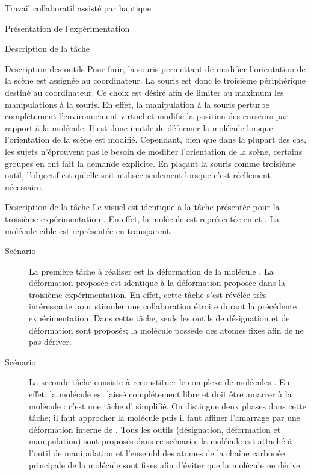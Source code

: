 \documentclass[myfrancais]{mythesis}
\begin{document}
\begin{mychapter}{Travail collaboratif assisté par haptique}
\begin{mysection}{Présentation de l'expérimentation}
\begin{mysubsection}{Description de la tâche}
\begin{mysubsubsection}{Description des outils}
					Pour finir, la souris permettant de modifier l'orientation de la scène est assignée au coordinateur.
					La souris est donc le troisième périphérique destiné au coordinateur.
					Ce choix est désiré afin de limiter au maximum les manipulations à la souris.
					En effet, la manipulation à la souris perturbe complètement l'environnement virtuel et modifie la position des curseurs par rapport à la molécule.
					Il est donc inutile de déformer la molécule lorsque l'orientation de la scène est modifié.
					Cependant, bien que dans la plupart des cas, les sujets n'éprouvent pas le besoin de modifier l'orientation de la scène, certains groupes en ont fait la demande explicite.
					En plaçant la souris comme troisième outil, l'objectif est qu'elle soit utilisée seulement lorsque c'est réellement nécessaire.
				\end{mysubsubsection}
				\begin{mysubsubsection}{Description de la tâche}
					Le visuel est identique à la tâche présentée pour la troisième expérimentation .
					En effet, la molécule est représentée en \myCPK et \myNewRibbon.
					La molécule cible est représentée en \myNewRibbon transparent.
					\begin{description}
						\item[Scénario~]
							La première tâche à réaliser est la déformation de la molécule \myUbiquitin.
							La déformation proposée est identique à la déformation proposée dans la troisième expérimentation.
							En effet, cette tâche s'est révélée très intéressante pour stimuler une collaboration étroite durant la précédente expérimentation.
							Dans cette tâche, seuls les outils de désignation et de déformation sont proposés; la molécule \myUbiquitin possède des atomes fixes afin de ne pas dériver.
						\item[Scénario~]
							La seconde tâche consiste à reconstituer le complexe de molécules \myNusENusG.
							En effet, la molécule \myNusG est laissé complétement libre et doit être amarrer à la molécule \myNusE : c'est une tâche d' simplifié.
							On distingue deux phases dans cette tâche; il faut approcher la molécule \myNusG puis il faut affiner l'amarrage par une déformation interne de \myNusG.
							Tous les outils (désignation, déformation et manipulation) sont proposés dans ce scénario; la molécule \myNusG est attaché à l'outil de manipulation et l'ensembl des atomes de la chaîne carbonée principale de la molécule \myNusE sont fixes afin d'éviter que la molécule ne dérive.
					\end{description}


\end{mysubsubsection}
\end{mysubsection}
\end{mysection}
\end{mychapter}
\end{document}
